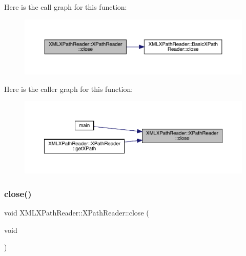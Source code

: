 Here is the call graph for this function\+:
\nopagebreak
\begin{figure}[H]
\begin{center}
\leavevmode
\includegraphics[width=350pt]{d3/d5a/classXMLXPathReader_1_1XPathReader_a2b6cfab8c9771da838a2bca6c9f23cb9_cgraph}
\end{center}
\end{figure}
Here is the caller graph for this function\+:
\nopagebreak
\begin{figure}[H]
\begin{center}
\leavevmode
\includegraphics[width=350pt]{d3/d5a/classXMLXPathReader_1_1XPathReader_a2b6cfab8c9771da838a2bca6c9f23cb9_icgraph}
\end{center}
\end{figure}
\mbox{\label{classXMLXPathReader_1_1XPathReader_a2b6cfab8c9771da838a2bca6c9f23cb9}} 
\subsubsection{\texorpdfstring{close()}{close()}\hspace{0.1cm}{\footnotesize\ttfamily [2/3]}}
{\footnotesize\ttfamily void X\+M\+L\+X\+Path\+Reader\+::\+X\+Path\+Reader\+::close (\begin{DoxyParamCaption}\item[{void}]{ }\end{DoxyParamCaption})\hspace{0.3cm}{\ttfamily [inline]}}

